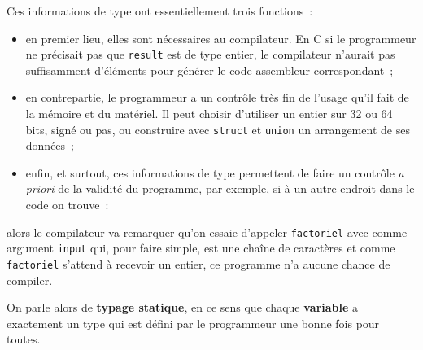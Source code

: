     Ces informations de type ont essentiellement trois fonctions~:

\begin{itemize}
\tightlist
\item
  en premier lieu, elles sont nécessaires au compilateur. En C si le
  programmeur ne précisait pas que \texttt{result} est de type entier,
  le compilateur n'aurait pas suffisamment d'éléments pour générer le
  code assembleur correspondant~;
\item
  en contrepartie, le programmeur a un contrôle très fin de l'usage
  qu'il fait de la mémoire et du matériel. Il peut choisir d'utiliser un
  entier sur 32 ou 64 bits, signé ou pas, ou construire avec
  \texttt{struct} et \texttt{union} un arrangement de ses données~;
\item
  enfin, et surtout, ces informations de type permettent de faire un
  contrôle \emph{a priori} de la validité du programme, par exemple, si
  à un autre endroit dans le code on trouve~:
\end{itemize}

    \begin{Shaded}
\end{Shaded}

    alors le compilateur va remarquer qu'on essaie d'appeler
\texttt{factoriel} avec comme argument \texttt{input} qui, pour faire
simple, est une chaîne de caractères et comme \texttt{factoriel}
s'attend à recevoir un entier, ce programme n'a aucune chance de
compiler.

On parle alors de \textbf{typage statique}, en ce sens que chaque
\textbf{variable} a exactement un type qui est défini par le programmeur
une bonne fois pour toutes.\\

